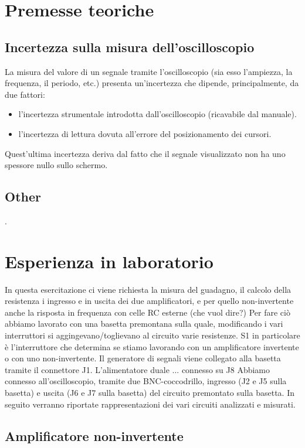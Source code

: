 \documentclass[a4paper]{article}
\begin{document}
	\section{Premesse teoriche}
		\subsection{Incertezza sulla misura dell'oscilloscopio}
			La misura del valore di un segnale tramite l’oscilloscopio (sia esso l'ampiezza, la frequenza, il periodo, etc.) presenta un'incertezza che dipende, principalmente, da due fattori:
			\begin{itemize}
				\item l’incertezza strumentale introdotta dall’oscilloscopio (ricavabile dal manuale).
				\item l’incertezza di lettura dovuta all’errore del posizionamento dei cursori.
			\end{itemize}
			Quest’ultima incertezza deriva dal fatto che il segnale visualizzato non ha uno spessore nullo sullo schermo.
		\subsection{Other}
			.
	\section{Esperienza in laboratorio}
		In questa esercitazione ci viene richiesta la misura del guadagno, il calcolo della resistenza i ingresso e in uscita dei due amplificatori, e per quello non-invertente anche la risposta in frequenza con celle RC esterne (che vuol dire?)
		Per fare ciò abbiamo lavorato con una basetta premontana sulla quale, modificando i vari interruttori si aggingevano/toglievano al circuito varie resistenze.
		S1 in particolare è l'interruttore che determina se stiamo lavorando con un amplificatore invertente o con uno non-invertente.
		Il generatore di segnali viene collegato alla basetta tramite il connettore J1.
		L'alimentatore duale ... connesso su J8
		Abbiamo connesso all'oscilloscopio, tramite due BNC-coccodrillo, ingresso (J2 e J5 sulla basetta)
		e uscita (J6 e J7 sulla basetta) del circuito premontato sulla basetta. %
		In seguito verranno riportate rappresentazioni dei vari circuiti analizzati e misurati.
		\subsection{Amplificatore non-invertente}
\end{document}
